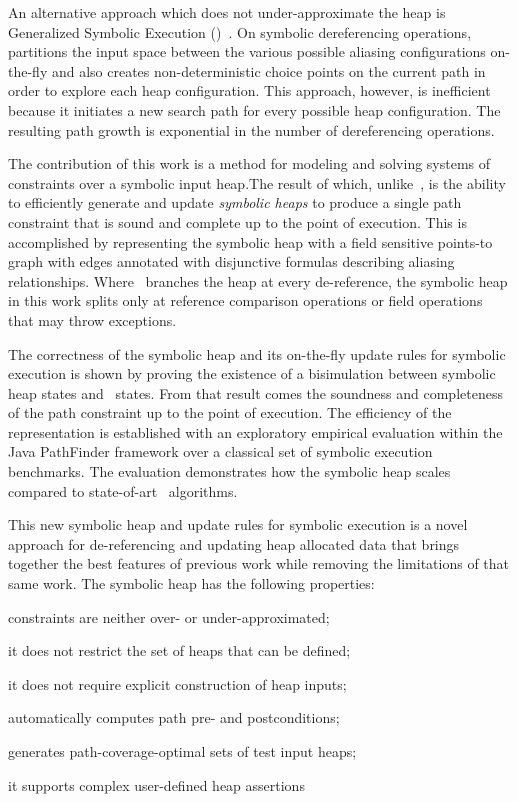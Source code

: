 An alternative approach which does not under-approximate the heap is
Generalized Symbolic Execution
(\gsetxt{})~\cite{Cadar:2008,KiasanKunit,GSE03,Rosner:2015}.  On symbolic
dereferencing operations,~\gsetxt{} partitions the input space between the
various possible aliasing configurations on-the-fly and also creates
non-deterministic choice points on the current path in order to
explore each heap configuration. This approach, however, is
inefficient because it initiates a new search path for every possible heap configuration.
The resulting path growth is exponential in the number of dereferencing operations.

The contribution of this work is a method for modeling and solving systems 
of constraints over a symbolic input heap.The
result of which, unlike~\gsetxt{}, is the ability to efficiently generate
and update \emph{symbolic heaps} to produce a single path constraint
that is sound and complete up to the point of execution. This is
accomplished by representing the symbolic heap with a field sensitive
points-to graph with edges annotated with disjunctive formulas
describing aliasing relationships. Where~\gsetxt{} branches the heap at every
de-reference, the symbolic heap in this work splits only at reference
comparison operations or field operations that may throw exceptions.

The correctness of the symbolic heap and its on-the-fly update rules
for symbolic execution is shown by proving the existence of a
bisimulation between symbolic heap states and~\gsetxt{} states. From that
result comes the soundness and completeness of the path constraint up
to the point of execution.  The efficiency of the representation is
established with an exploratory empirical evaluation within the Java
PathFinder framework over a classical set of symbolic execution
benchmarks. The evaluation demonstrates how the symbolic heap scales
compared to state-of-art~\gsetxt{} algorithms.

This new symbolic heap and update rules for symbolic execution is a
novel approach for de-referencing and updating heap allocated data
that brings together the best features of previous work while removing
the limitations of that same work. The symbolic heap has the following 
properties:
\begin{compactitem}
  \item constraints are neither over- or under-approximated;
  \item it does not restrict the set of heaps that can be defined;
  \item it does not require explicit construction of heap inputs;
  \item automatically computes path pre- and postconditions;
  \item generates path-coverage-optimal sets of test input heaps;
  \item it supports complex user-defined heap assertions 
\end{compactitem}


